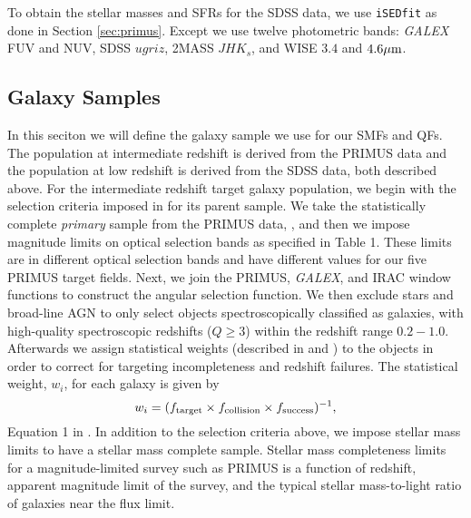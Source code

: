 \documentclass{emulateapj}
\begin{document}
To obtain the stellar masses and SFRs for the SDSS data, we use \texttt{iSEDfit} as done in Section \ref{sec:primus}. 
Except we use twelve photometric bands: {\em GALEX} FUV and NUV, SDSS $ugriz$, 2MASS $JHK_{s}$, and WISE $3.4$ and $4.6 \mu \rm{m}$.
\subsection{Galaxy Samples} \label{sec:target} 
In this seciton we will define the galaxy sample we use for our SMFs and QFs.
The population at intermediate redshift is derived from the PRIMUS data and the population at low redshift is derived from the SDSS data, both described above.
For the intermediate redshift target galaxy population, we begin with the selection criteria imposed in \cite{Moustakas:2013aa} for its parent sample.
We take the statistically complete {\em primary} sample from the PRIMUS data, \cite{Coil:2011aa}, and then we impose magnitude limits on optical selection bands as specified in 
\cite{Moustakas:2013aa} Table 1.
These limits are in different optical selection bands and have different values for our five PRIMUS target fields.
Next, we join the PRIMUS, {\em GALEX}, and IRAC window functions to construct the angular selection function.
We then exclude stars and broad-line AGN to only select objects spectroscopically classified as galaxies, with high-quality spectroscopic redshifts ($Q \geq 3$) within the 
redshift range $0.2 - 1.0$.
Afterwards we assign statistical weights (described in \cite{Coil:2011aa} and \cite{Cool:2013aa}) to the objects in order to correct for targeting incompleteness and redshift 
failures.
The statistical weight, $w_i$, for each galaxy is given by
\begin{equation}
w_{i} = (f_{\rm{target}} \times f_{\rm{collision}} \times f_{\rm{success}})^{-1},
\end{equation}
Equation 1 in \cite{Moustakas:2013aa}.
In addition to the selection criteria above, we impose stellar mass limits to have a stellar mass complete sample.  
Stellar mass completeness limits for a magnitude-limited survey such as PRIMUS is a function of redshift, apparent magnitude limit of the survey, and the typical stellar 
mass-to-light ratio of galaxies near the flux limit.
\end{document}
